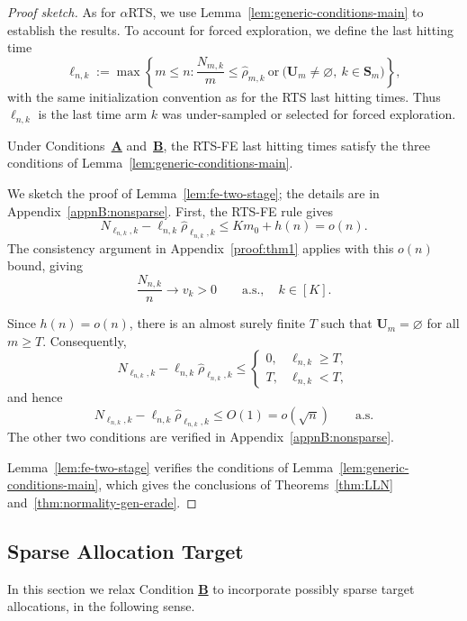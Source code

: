 \begin{proof}[Proof sketch]
{\color{revisiongreen}
As for \(\alpha\)RTS, we use Lemma~\ref{lem:generic-conditions-main} to establish the results. To account for forced exploration, we define the last hitting time
\[
\ell_{n,k}:=\max\left\{m\leq n:
\frac{N_{m,k}}m\leq\hat\rho_{m,k}
\ \text{or}\ \bigl(\mathbf U_m\ne\varnothing,\ k\in\mathbf S_m\bigr)\right\},
\]
with the same initialization convention as for the RTS last hitting times. Thus \(\ell_{n,k}\) is the last time arm \(k\) was under-sampled or selected for forced exploration.

\begin{lemma}\label{lem:fe-two-stage}
Under Conditions~\hyperlink{CA}{\textbf{A}} and~\hyperlink{CB}{\textbf{B}}, the RTS-FE last hitting times satisfy the three conditions of Lemma~\ref{lem:generic-conditions-main}.
\end{lemma}

We sketch the proof of Lemma~\ref{lem:fe-two-stage}; the details are in Appendix~\ref{appnB:nonsparse}. First, the RTS-FE rule gives
\[
N_{\ell_{n,k},k}-\ell_{n,k}\hat\rho_{\ell_{n,k},k}
\leq Km_0+h(n)=o(n).
\]
The consistency argument in Appendix~\ref{proof:thm1} applies with this \(o(n)\) bound, giving
\[
\frac{N_{n,k}}n\longrightarrow v_k>0\qquad\text{a.s.},\quad k\in[K].
\]

Since \(h(n)=o(n)\), there is an almost surely finite \(T\) such that \(\mathbf U_m=\varnothing\) for all \(m\geq T\). Consequently,
\[
N_{\ell_{n,k},k}-\ell_{n,k}\hat\rho_{\ell_{n,k},k}
\leq
\begin{cases}
0, & \ell_{n,k}\geq T,\\
T, & \ell_{n,k}<T,
\end{cases}
\]
and hence
\[
N_{\ell_{n,k},k}-\ell_{n,k}\hat\rho_{\ell_{n,k},k}
\leq O(1)=o(\sqrt n)\qquad\text{a.s.}
\]
The other two conditions are verified in Appendix~\ref{appnB:nonsparse}.

Lemma~\ref{lem:fe-two-stage} verifies the conditions of Lemma~\ref{lem:generic-conditions-main}, which gives the conclusions of Theorems~\ref{thm:LLN} and~\ref{thm:normality-gen-erade}.
}	
\end{proof}
\subsection{Sparse Allocation Target} 

In this section we relax Condition \hyperlink{CB}{\textbf{B}} to incorporate possibly sparse target allocations, in the following sense.

